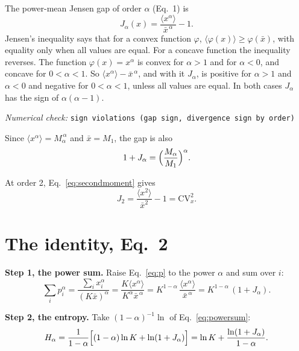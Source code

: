 \documentclass[11pt]{article}
\newcommand{\CV}{\mathrm{CV}}
\newcommand{\numcheck}[1]{\par{\small\raggedright\noindent\textit{Numerical check:} \texttt{#1}\par}}
\begin{document}
The power-mean Jensen gap of order $\alpha$ (Eq.~1) is
\begin{equation}
J_\alpha(x) = \frac{\langle x^{\alpha}\rangle}{\bar x^{\,\alpha}} - 1 .
\label{eq:J}
\end{equation}
Jensen's inequality says that for a convex function $\varphi$, $\langle\varphi(x)\rangle \ge \varphi(\bar x)$, with
equality only when all values are equal. For a concave function the inequality reverses. The function
$\varphi(x)=x^{\alpha}$ is convex for $\alpha>1$ and for $\alpha<0$, and concave for $0<\alpha<1$. So
$\langle x^\alpha\rangle - \bar x^{\,\alpha}$, and with it $J_\alpha$, is positive for $\alpha>1$ and $\alpha<0$ and
negative for $0<\alpha<1$, unless all values are equal. In both cases $J_\alpha$ has the sign of $\alpha(\alpha-1)$.
\numcheck{sign violations (gap sign, divergence sign by order)}

Since $\langle x^\alpha\rangle = M_\alpha^{\,\alpha}$ and $\bar x = M_1$, the gap is also
\begin{equation}
1 + J_\alpha = \Bigl(\frac{M_\alpha}{M_1}\Bigr)^{\alpha} .
\label{eq:Jpower}
\end{equation}

At order 2, Eq.~\eqref{eq:secondmoment} gives
\begin{equation}
J_2 = \frac{\langle x^2\rangle}{\bar x^2} - 1 = \CV_x^2 .
\label{eq:J2}
\end{equation}

\section{The identity, Eq.~2}
\label{sec:identity}

\textbf{Step 1, the power sum.} Raise Eq.~\eqref{eq:p} to the power $\alpha$ and sum over $i$:
\begin{equation}
\sum_i p_i^{\alpha} = \frac{\sum_i x_i^{\alpha}}{(K\bar x)^{\alpha}}
= \frac{K\langle x^{\alpha}\rangle}{K^{\alpha}\bar x^{\,\alpha}}
= K^{1-\alpha}\,\frac{\langle x^{\alpha}\rangle}{\bar x^{\,\alpha}}
= K^{1-\alpha}\,(1+J_\alpha) .
\label{eq:powersum}
\end{equation}

\textbf{Step 2, the entropy.} Take $(1-\alpha)^{-1}\ln$ of Eq.~\eqref{eq:powersum}:
\begin{equation}
H_\alpha = \frac{1}{1-\alpha}\Bigl[(1-\alpha)\ln K + \ln(1+J_\alpha)\Bigr] = \ln K + \frac{\ln(1+J_\alpha)}{1-\alpha} .
\end{equation}
\end{document}

